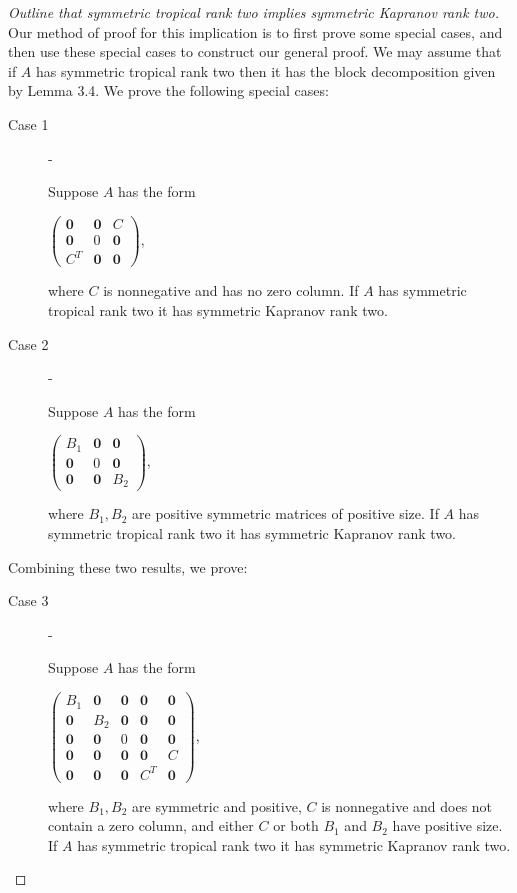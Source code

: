 \documentclass{article}
\begin{document}
\begin{proof}[Outline that symmetric tropical rank two implies symmetric Kapranov rank two]
  Our method of proof for this implication is to first prove some special cases, and then use these special cases to construct our general proof. We may assume that if $A$ has symmetric tropical rank two then it has the block decomposition given by Lemma 3.4. We prove the following special cases:
  \begin{description}
  \item[Case 1] -  

    Suppose $A$ has the form
    \begin{center}
      $\left(\begin{array}{ccc} \textbf{0} & \textbf{0} & C \\ \textbf{0} & 0 & \textbf{0} \\ C^{T} & \textbf{0} & \textbf{0} \end{array}\right)$,
    \end{center}
    where $C$ is nonnegative and has no zero column. If $A$ has symmetric tropical rank two it has symmetric Kapranov rank two.
    
  \item[Case 2] -

    Suppose $A$ has the form
    \begin{center}
      $\left(\begin{array}{ccc} B_{1} & \textbf{0} & \textbf{0} \\ \textbf{0} & 0 & \textbf{0} \\ \textbf{0} & \textbf{0} & B_{2} \end{array}\right)$,
    \end{center}    
    where $B_{1}, B_{2}$ are positive symmetric matrices of positive size. If $A$ has symmetric tropical rank two it has symmetric Kapranov rank two.
  \end{description}
  
  Combining these two results, we prove:

  \begin{description}
  \item[Case 3] -

    Suppose $A$ has the form   
    \begin{center}
      $\left(\begin{array}{ccccc} B_{1} & \textbf{0} & \textbf{0} & \textbf{0} & \textbf{0} \\ \textbf{0} & B_{2} & \textbf{0} & \textbf{0} & \textbf{0} \\ \textbf{0} & \textbf{0} & 0 & \textbf{0} & \textbf{0} \\ \textbf{0} & \textbf{0} & \textbf{0} & \textbf{0} & C \\ \textbf{0} & \textbf{0} & \textbf{0} & C^{T} & \textbf{0} \end{array}\right)$,
    \end{center}
    where $B_{1}, B_{2}$ are symmetric and positive, $C$ is nonnegative and does not contain a zero column, and either $C$ or both $B_{1}$ and $B_{2}$ have positive size. If $A$ has symmetric tropical rank two it has symmetric Kapranov rank two.
  \end{description}
  

\end{proof}
\end{document}
